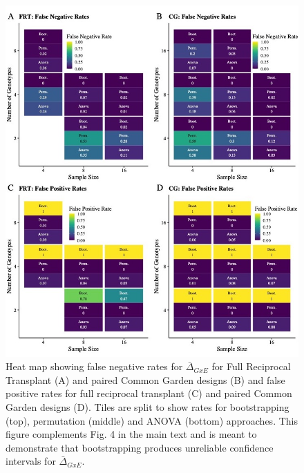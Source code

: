 \documentclass[11pt, oneside]{amsart}
\begin{document}
\clearpage
\newpage
\renewcommand\thefigure{S4}
\begin{figure}[h]
\begin{center}
\includegraphics[width=6in]{Figs/GxE_Panel.jpg}
\end{center}
\label{Fig: }
\caption[False negative rates for $\bar\Delta_{GxE}$ for Full Reciprocal Transplant (A) and paired Common Garden designs (B) and false positive rates for full reciprocal transplant (C) and paired Common Garden designs (D). ] {Heat map showing false negative rates for $\bar\Delta_{GxE}$ for Full Reciprocal Transplant (A) and paired Common Garden designs (B) and false positive rates for full reciprocal transplant (C) and paired Common Garden designs (D). Tiles are split to show rates for bootstrapping (top), permutation (middle) and ANOVA (bottom) approaches. This figure complements Fig. 4 in the main text and is meant to demonstrate that bootstrapping produces unreliable confidence intervals for  $\bar\Delta_{GxE}$. }

\end{figure}

\clearpage
\newpage
\end{document}

